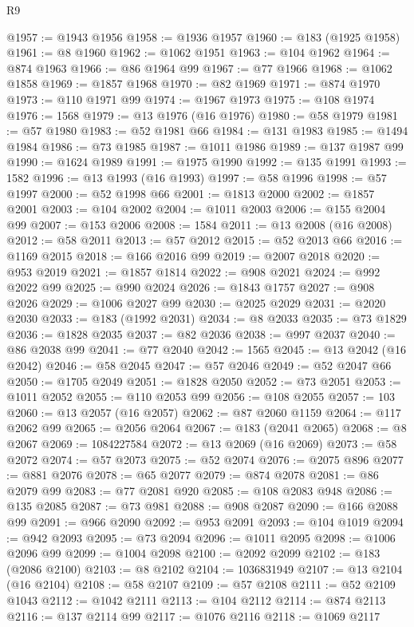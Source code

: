 \begin{lexlean}{R9}
\begin{coremodule}
@1957 := @1943 @1956
@1958 := @1936 @1957
@1960 := @183 (@1925 @1958)
@1961 := @8 @1960
@1962 := @1062 @1951
@1963 := @104 @1962
@1964 := @874 @1963
@1966 := @86 @1964 @99
@1967 := @77 @1966
@1968 := @1062 @1858
@1969 := @1857 @1968
@1970 := @82 @1969
@1971 := @874 @1970
@1973 := @110 @1971 @99
@1974 := @1967 @1973
@1975 := @108 @1974
@1976 := 1568
@1979 := @13 @1976 (@16 @1976)
@1980 := @58 @1979
@1981 := @57 @1980
@1983 := @52 @1981 @66
@1984 := @131 @1983
@1985 := @1494 @1984
@1986 := @73 @1985
@1987 := @1011 @1986
@1989 := @137 @1987 @99
@1990 := @1624 @1989
@1991 := @1975 @1990
@1992 := @135 @1991
@1993 := 1582
@1996 := @13 @1993 (@16 @1993)
@1997 := @58 @1996
@1998 := @57 @1997
@2000 := @52 @1998 @66
@2001 := @1813 @2000
@2002 := @1857 @2001
@2003 := @104 @2002
@2004 := @1011 @2003
@2006 := @155 @2004 @99
@2007 := @153 @2006
@2008 := 1584
@2011 := @13 @2008 (@16 @2008)
@2012 := @58 @2011
@2013 := @57 @2012
@2015 := @52 @2013 @66
@2016 := @1169 @2015
@2018 := @166 @2016 @99
@2019 := @2007 @2018
@2020 := @953 @2019
@2021 := @1857 @1814
@2022 := @908 @2021
@2024 := @992 @2022 @99
@2025 := @990 @2024
@2026 := @1843 @1757
@2027 := @908 @2026
@2029 := @1006 @2027 @99
@2030 := @2025 @2029
@2031 := @2020 @2030
@2033 := @183 (@1992 @2031)
@2034 := @8 @2033
@2035 := @73 @1829
@2036 := @1828 @2035
@2037 := @82 @2036
@2038 := @997 @2037
@2040 := @86 @2038 @99
@2041 := @77 @2040
@2042 := 1565
@2045 := @13 @2042 (@16 @2042)
@2046 := @58 @2045
@2047 := @57 @2046
@2049 := @52 @2047 @66
@2050 := @1705 @2049
@2051 := @1828 @2050
@2052 := @73 @2051
@2053 := @1011 @2052
@2055 := @110 @2053 @99
@2056 := @108 @2055
@2057 := 103
@2060 := @13 @2057 (@16 @2057)
@2062 := @87 @2060 @1159
@2064 := @117 @2062 @99
@2065 := @2056 @2064
@2067 := @183 (@2041 @2065)
@2068 := @8 @2067
@2069 := 1084227584
@2072 := @13 @2069 (@16 @2069)
@2073 := @58 @2072
@2074 := @57 @2073
@2075 := @52 @2074
@2076 := @2075 @896
@2077 := @881 @2076
@2078 := @65 @2077
@2079 := @874 @2078
@2081 := @86 @2079 @99
@2083 := @77 @2081 @920
@2085 := @108 @2083 @948
@2086 := @135 @2085
@2087 := @73 @981
@2088 := @908 @2087
@2090 := @166 @2088 @99
@2091 := @966 @2090
@2092 := @953 @2091
@2093 := @104 @1019
@2094 := @942 @2093
@2095 := @73 @2094
@2096 := @1011 @2095
@2098 := @1006 @2096 @99
@2099 := @1004 @2098
@2100 := @2092 @2099
@2102 := @183 (@2086 @2100)
@2103 := @8 @2102
@2104 := 1036831949
@2107 := @13 @2104 (@16 @2104)
@2108 := @58 @2107
@2109 := @57 @2108
@2111 := @52 @2109 @1043
@2112 := @1042 @2111
@2113 := @104 @2112
@2114 := @874 @2113
@2116 := @137 @2114 @99
@2117 := @1076 @2116
@2118 := @1069 @2117

\end{coremodule}
\end{lexlean}
